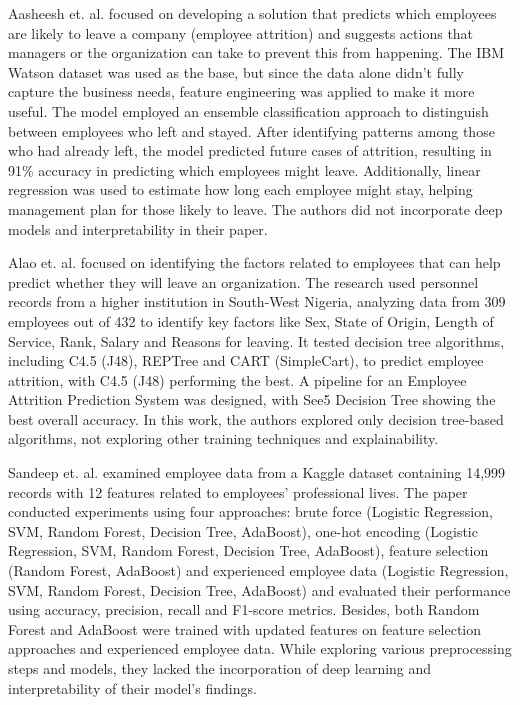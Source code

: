 \documentclass[a4paper,fleqn]{cas-sc}
\begin{document}
Aasheesh et. al. \cite{barvey2018proactive} focused on developing a solution that predicts which employees are likely to leave a company (employee attrition) and suggests actions that managers or the organization can take to prevent this from happening. The IBM Watson dataset was used as the base, but since the data alone didn't fully capture the business needs, feature engineering was applied to make it more useful. The model employed an ensemble classification approach to distinguish between employees who left and stayed. After identifying patterns among those who had already left, the model predicted future cases of attrition, resulting in 91\% accuracy in predicting which employees might leave. Additionally, linear regression was used to estimate how long each employee might stay, helping management plan for those likely to leave. The authors did not incorporate deep models and interpretability in their paper.

Alao et. al. \cite{alao2013analyzing} focused on identifying the factors related to employees that can help predict whether they will leave an organization. The research used personnel records from a higher institution in South-West Nigeria, analyzing data from 309 employees out of 432 to identify key factors like Sex, State of Origin, Length of Service, Rank, Salary and Reasons for leaving. It tested decision tree algorithms, including C4.5 (J48), REPTree and CART (SimpleCart), to predict employee attrition, with C4.5 (J48) performing the best. A pipeline for an Employee Attrition Prediction System was designed, with See5 Decision Tree showing the best overall accuracy. In this work, the authors explored only decision tree-based algorithms, not exploring other training techniques and explainability. 

Sandeep et. al. \cite{Yadav2018} examined employee data from a Kaggle dataset containing 14,999 records with 12 features related to employees' professional lives. The paper conducted experiments using four approaches: brute force (Logistic  Regression, SVM, Random Forest, Decision Tree, AdaBoost), one-hot encoding (Logistic  Regression, SVM, Random Forest, Decision Tree, AdaBoost), feature selection (Random Forest, AdaBoost) and experienced employee data (Logistic  Regression, SVM, Random Forest, Decision Tree, AdaBoost) and evaluated their performance using accuracy, precision, recall and F1-score metrics. Besides, both Random Forest and AdaBoost were trained with updated features on feature selection approaches and experienced employee data. While exploring various preprocessing steps and models, they lacked the incorporation of deep learning and interpretability of their model’s findings.
\end{document}
